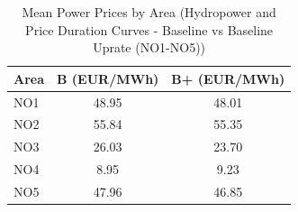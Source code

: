 \begin{table}[htbp]
\centering
\caption{Mean Power Prices by Area (Hydropower and Price Duration Curves - Baseline vs Baseline Uprate (NO1-NO5))}
\label{tab:mean_prices_NO_areas_baseline_vs_uprate}
\begin{tabular}{lcc}
\hline
Area & B (EUR/MWh) & B+ (EUR/MWh) \\
\hline
NO1 & 48.95 & 48.01 \\
NO2 & 55.84 & 55.35 \\
NO3 & 26.03 & 23.70 \\
NO4 & 8.95 & 9.23 \\
NO5 & 47.96 & 46.85 \\
\hline
\end{tabular}
\end{table}